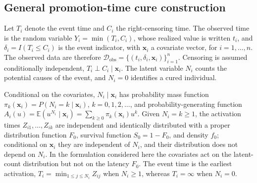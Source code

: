 \subsection{General promotion-time cure construction}\label{sec:promotion-time}

{

Let $T_i$ denote the event time and $C_i$ the right-censoring time. The observed time is the random variable $Y_i=\min(T_i,C_i)$, whose realized value is written $t_i$, and $\delta_i=I(T_i\leq C_i)$ is the event indicator, with $\bm{x}_i$ a covariate vector, for $i=1,\ldots,n$. The observed data are therefore $\mathcal{D}_{\text{obs}}=\{(t_i,\delta_i,\bm{x}_i)\}^{n}_{i=1}$. Censoring is assumed conditionally independent, $T_i\perp C_i\mid\bm{x}_i$. The latent variable $N_i$ counts the potential causes of the event, and $N_i=0$ identifies a cured individual.

Conditional on the covariates, $N_i\mid\bm{x}_i$ has probability mass function $\pi_k(\bm{x}_i)=P(N_i=k\mid\bm{x}_i)$, $k=0,1,2,\dots$, and probability-generating function $A_i(u)=\mathbb{E}\left(u^{N_i}\mid\bm{x}_i\right)=\sum_{k\ge0}\pi_k(\bm{x}_i)u^k$. Given $N_i=k\ge1$, the activation times $Z_{i1},\dots,Z_{ik}$ are independent and identically distributed with a proper distribution function $F_0$, survival function $S_0=1-F_0$, and density $f_0$; conditional on $\bm{x}_i$ they are independent of $N_i$, and their distribution does not depend on $N_i$. In the formulation considered here the covariates act on the latent-count distribution but not on the latency $F_0$. The event time is the earliest activation, $T_i=\min_{1\le j\le N_i}Z_{ij}$ when $N_i\ge1$, whereas $T_i=\infty$ when $N_i=0$.

}
